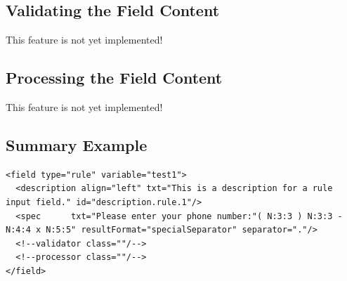 \subsection{Validating the Field Content}

This feature is not yet implemented!\\

\subsection{Processing the Field Content}

This feature is not yet implemented!\\

\subsection{Summary Example}

\footnotesize
\begin{verbatim}
<field type="rule" variable="test1">
  <description align="left" txt="This is a description for a rule input field." id="description.rule.1"/>
  <spec      txt="Please enter your phone number:"( N:3:3 ) N:3:3 - N:4:4 x N:5:5" resultFormat="specialSeparator" separator="."/>
  <!--validator class=""/-->
  <!--processor class=""/-->
</field>
\end{verbatim}
\normalsize









